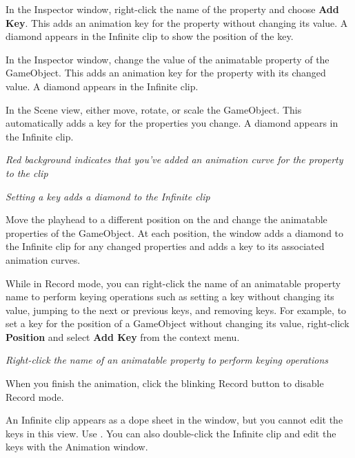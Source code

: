 \begin{DoxyItemize}
\item In the Inspector window, right-\/click the name of the property and choose {\bfseries{Add Key}}. This adds an animation key for the property without changing its value. A diamond appears in the Infinite clip to show the position of the key.
\item In the Inspector window, change the value of the animatable property of the Game\+Object. This adds an animation key for the property with its changed value. A diamond appears in the Infinite clip.
\item In the Scene view, either move, rotate, or scale the Game\+Object. This automatically adds a key for the properties you change. A diamond appears in the Infinite clip.
\end{DoxyItemize}



{\itshape Red background indicates that you’ve added an animation curve for the property to the clip}



{\itshape Setting a key adds a diamond to the Infinite clip}

Move the playhead to a different position on the  and change the animatable properties of the Game\+Object. At each position, the  window adds a diamond to the Infinite clip for any changed properties and adds a key to its associated animation curves.

While in Record mode, you can right-\/click the name of an animatable property name to perform keying operations such as setting a key without changing its value, jumping to the next or previous keys, and removing keys. For example, to set a key for the position of a Game\+Object without changing its value, right-\/click {\bfseries{Position}} and select {\bfseries{Add Key}} from the context menu.



{\itshape Right-\/click the name of an animatable property to perform keying operations}

When you finish the animation, click the blinking Record button to disable Record mode.

An Infinite clip appears as a dope sheet in the  window, but you cannot edit the keys in this view. Use . You can also double-\/click the Infinite clip and edit the keys with the Animation window.



